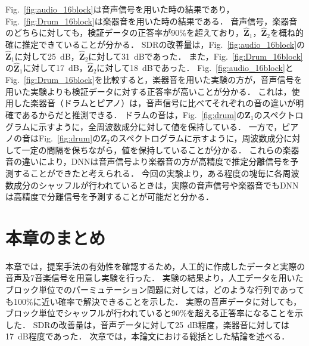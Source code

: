 Fig.~\ref{fig:audio_16block}は音声信号を用いた時の結果であり，Fig.~\ref{fig:Drum_16block}は楽器音を用いた時の結果である．
音声信号，楽器音のどちらに対しても，検証データの正答率が90\%を超えており，$\hat{\bm{Z}}_1$，$\hat{\bm{Z}}_2$を概ね的確に推定できていることが分かる．
SDRの改善量は，Fig.~\ref{fig:audio_16block}の$\hat{\bm{Z}}_1$に対して25~dB，$\hat{\bm{Z}}_2$に対して31~dBであった．
また，Fig.~\ref{fig:Drum_16block}の$\hat{\bm{Z}}_1$に対して17~dB，$\hat{\bm{Z}}_2$に対して18~dBであった．
Fig.~\ref{fig:audio_16block}とFig.~\ref{fig:Drum_16block}を比較すると，楽器音を用いた実験の方が，音声信号を用いた実験よりも検証データに対する正答率が高いことが分かる．
これは，使用した楽器音（ドラムとピアノ）は，音声信号に比べてそれぞれの音の違いが明確であるからだと推測できる．
ドラムの音は，Fig.~\ref{fig:drum}の$\bm{Z}_1$のスペクトログラムに示すように，全周波数成分に対して値を保持している．
一方で，ピアノの音はFig.~\ref{fig:drum}の$\bm{Z}_2$のスペクトログラムに示すように，周波数成分に対して一定の間隔を保ちながら，値を保持していることが分かる．
これらの楽器音の違いにより，DNNは音声信号より楽器音の方が高精度で推定分離信号を予測することができたと考えられる．
今回の実験より，ある程度の塊毎に各周波数成分のシャッフルが行われているときは，実際の音声信号や楽器音でもDNNは高精度で分離信号を予測することが可能だと分かる．

\clearpage
\section{本章のまとめ}
\label{sec:matome}
本章では，提案手法の有効性を確認するため，人工的に作成したデータと実際の音声及7音楽信号を用意し実験を行った．
実験の結果より，人工データを用いたブロック単位でのパーミュテーション問題に対しては，どのような行列であっても100\%に近い確率で解決できることを示した．
実際の音声データに対しても，ブロック単位でシャッフルが行われていると90\%を超える正答率になることを示した．
SDRの改善量は，音声データに対して25~dB程度，楽器音に対しては17~dB程度であった．
次章では，本論文における総括とした結論を述べる．
